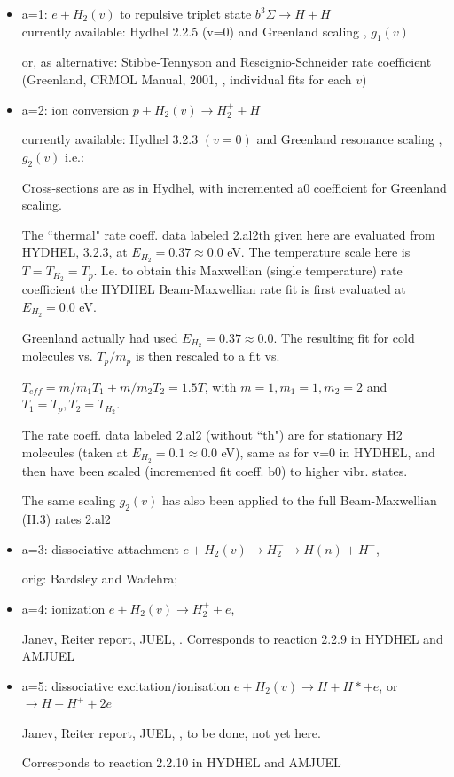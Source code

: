 \documentclass[12pt,dvipdfmx]{article}
\begin{document}
\begin{itemize}

\item{a=1}: $e + H_2(v) $ to repulsive triplet state $b^3\Sigma \rightarrow H+H $ \\

     currently available: Hydhel 2.2.5 (v=0) and Greenland scaling \cite{kn:Green}, $g_1(v)$

                      or, as alternative: Stibbe-Tennyson and Rescignio-Schneider rate coefficient
                      (Greenland, CRMOL Manual, 2001, \cite{kn:Tennyson}, individual fits for each $v$)

\item{a=2}: ion conversion $p+H_2(v) \rightarrow H_2^+  +  H$

     currently available: Hydhel 3.2.3 $(v=0)$ and Greenland
                           resonance scaling \cite{kn:Green}, $g_2(v)$ i.e.:

     Cross-sections are as in Hydhel, with incremented a0 coefficient for Greenland scaling.

     The ``thermal" rate coeff. data labeled 2.al2th given here are evaluated from HYDHEL, 3.2.3,
     at $E_{H_2}=0.37\approx 0.0$ eV.
     The temperature scale here
     is $T=T_{H_2} = T_p$.
 I.e. to obtain this Maxwellian (single temperature) rate coefficient
 the HYDHEL Beam-Maxwellian rate fit is first evaluated at $E_{H_2} = 0.0$ eV.

 Greenland actually had used  $E_{H_2}=0.37 \approx 0.0$.
 The resulting fit
 for cold molecules vs. $T_p/m_p$ is then rescaled to a fit vs.

     $T_{eff}= m/m_1 T_1 + m/m_2 T_2 = 1.5 T$, with $m=1, m_1=1, m_2=2$
     and $T_1=T_p, T_2=T_{H_2}$.

     The rate coeff. data labeled 2.al2  (without ``th") are for stationary H2 molecules (taken at $E_{H_2}=0.1\approx 0.0$ eV), same as for v=0 in HYDHEL, and then
     have been scaled (incremented fit coeff. b0) to higher vibr. states.

     The same scaling $g_2(v)$ has also been applied to the full Beam-Maxwellian (H.3) rates 2.al2

\item{a=3}: dissociative attachment  $e + H_2(v) \rightarrow H_2^- \rightarrow H(n) + H^-$,

orig: Bardsley and Wadehra; \cite{kn:Green}

\item{a=4}: ionization $e + H_2(v) \rightarrow H_2^+  + e$,

Janev, Reiter report, JUEL, \cite{kn:JRS}.
Corresponds to reaction 2.2.9 in HYDHEL and AMJUEL

\item{a=5}: dissociative excitation/ionisation $e + H_2(v) \rightarrow H + H*  + e$, or
$\rightarrow H + H^+ + 2e$

Janev, Reiter report, JUEL, \cite{kn:JRS}, to be done, not yet here.

Corresponds to reaction 2.2.10 in HYDHEL and AMJUEL

\end{itemize}
\newpage
\end{document}

